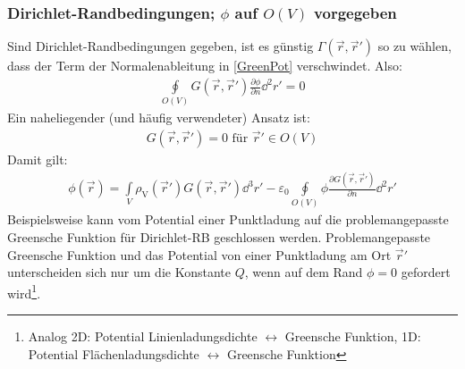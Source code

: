   \subsubsection{Dirichlet-Randbedingungen; $\phi$ auf $O(V)$ vorgegeben}
		    Sind Dirichlet-Randbedingungen gegeben, ist es günstig $\Gamma(\vec{r} ,\vec{r}' )$ so zu wählen, dass der Term der Normalenableitung in \ref{GreenPot} verschwindet. Also:
		        \begin{equation}\begin{split}
				        \oint\limits_{O(V)} G(\vec{r} ,\vec{r}' ) \frac{\partial\phi}{\partial n} \dd^2r' = 0
			        \end{split}\end{equation}
		    Ein naheliegender (und häufig verwendeter) Ansatz ist:
		        \begin{equation}\begin{split}
				        G(\vec{r} ,\vec{r}' ) = 0 \text{ für } \vec{r}'  \in O(V)
			        \end{split}\end{equation}
		   Damit gilt:
		        \begin{equation}\begin{split}
				        \boxed{ \phi(\vec{r} ) = \int\limits_V \rho_\text{V}(\vec{r}' ) G(\vec{r} ,\vec{r}' ) \dd^3 r' - \varepsilon_0 \oint\limits_{O(V)}  \phi\frac{\partial G(\vec{r} ,\vec{r}' )}{\partial n} \dd^2r'}
			        \end{split}\end{equation}
		        Beispielsweise kann vom Potential einer Punktladung auf die problemangepasste Greensche Funktion für Dirichlet-RB geschlossen werden. Problemangepasste Greensche Funktion und das Potential von einer Punktladung am Ort $\vec{r}'$ unterscheiden sich nur um die Konstante $Q$, wenn auf dem Rand $\phi=0$ gefordert wird\footnote{Analog 2D: Potential Linienladungsdichte $\leftrightarrow$ Greensche Funktion, 1D: Potential Flächenladungsdichte $\leftrightarrow$ Greensche Funktion}.
